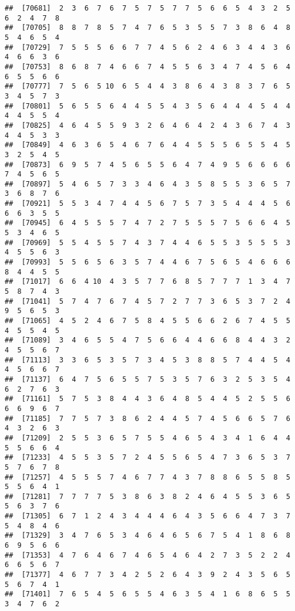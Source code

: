 \documentclass[
]{book}
\begin{document}
\begin{verbatim}
##  [70681]  2  3  6  7  6  7  5  7  5  7  7  5  6  6  5  4  3  2  5  6  2  4  7  8
##  [70705]  8  8  7  8  5  7  4  7  6  5  3  5  5  7  3  8  6  4  8  5  4  6  5  4
##  [70729]  7  5  5  5  6  6  7  7  4  5  6  2  4  6  3  4  4  3  6  4  6  6  3  6
##  [70753]  8  6  8  7  4  6  6  7  4  5  5  6  3  4  7  4  5  6  4  6  5  5  6  6
##  [70777]  7  5  6  5 10  6  5  4  4  3  8  6  4  3  8  3  7  6  5  3  4  5  7  3
##  [70801]  5  6  5  5  6  4  4  5  5  4  3  5  6  4  4  4  5  4  4  4  4  5  5  4
##  [70825]  4  6  4  5  5  9  3  2  6  4  6  4  2  4  3  6  7  4  3  4  4  5  3  3
##  [70849]  4  6  3  6  5  4  6  7  6  4  4  5  5  5  6  5  5  4  5  3  2  5  4  5
##  [70873]  6  9  5  7  4  5  6  5  5  6  4  7  4  9  5  6  6  6  6  7  4  5  6  5
##  [70897]  5  4  6  5  7  3  3  4  6  4  3  5  8  5  5  3  6  5  7  3  6  8  7  6
##  [70921]  5  5  3  4  7  4  4  5  6  7  5  7  3  5  4  4  4  5  6  6  6  3  5  5
##  [70945]  6  4  5  5  5  7  4  7  2  7  5  5  5  7  5  6  6  4  5  5  3  4  6  5
##  [70969]  5  5  4  5  5  7  4  3  7  4  4  6  5  5  3  5  5  5  3  4  5  5  6  3
##  [70993]  5  5  6  5  6  3  5  7  4  4  6  7  5  6  5  4  6  6  6  8  4  4  5  5
##  [71017]  6  6  4 10  4  3  5  7  7  6  8  5  7  7  7  1  3  4  7  5  8  7  4  3
##  [71041]  5  7  4  7  6  7  4  5  7  2  7  7  3  6  5  3  7  2  4  9  5  6  5  3
##  [71065]  4  5  2  4  6  7  5  8  4  5  5  6  6  2  6  7  4  5  5  4  5  5  4  5
##  [71089]  3  4  6  5  5  4  7  5  6  6  4  4  6  6  8  4  4  3  2  4  5  5  6  7
##  [71113]  3  3  6  5  3  5  7  3  4  5  3  8  8  5  7  4  4  5  4  4  5  6  6  7
##  [71137]  6  4  7  5  6  5  5  7  5  3  5  7  6  3  2  5  3  5  4  6  2  7  6  3
##  [71161]  5  7  5  3  8  4  4  3  6  4  8  5  4  4  5  2  5  5  6  6  6  9  6  7
##  [71185]  7  7  5  7  3  8  6  2  4  4  5  7  4  5  6  6  5  7  6  4  3  2  6  3
##  [71209]  2  5  5  3  6  5  7  5  5  4  6  5  4  3  4  1  6  4  4  5  5  6  6  4
##  [71233]  4  5  5  3  5  7  2  4  5  5  6  5  4  7  3  6  5  3  7  5  7  6  7  8
##  [71257]  4  5  5  5  7  4  6  7  7  4  3  7  8  8  6  5  5  8  5  5  5  6  4  1
##  [71281]  7  7  7  7  5  3  8  6  3  8  2  4  6  4  5  5  3  6  5  5  6  3  7  6
##  [71305]  6  7  1  2  4  3  4  4  4  6  4  3  5  6  6  4  7  3  7  5  4  8  4  6
##  [71329]  3  4  7  6  5  3  4  6  4  6  5  6  7  5  4  1  8  6  8  6  9  5  6  6
##  [71353]  4  7  6  4  6  7  4  6  5  4  6  4  2  7  3  5  2  2  4  6  6  5  6  7
##  [71377]  4  6  7  7  3  4  2  5  2  6  4  3  9  2  4  3  5  6  5  5  6  7  4  1
##  [71401]  7  6  5  4  5  6  5  5  4  6  3  5  4  1  6  8  6  5  5  3  4  7  6  2

\end{verbatim}
\end{document}
